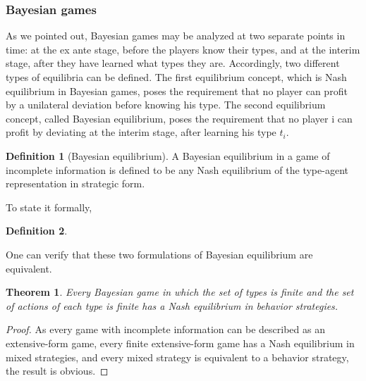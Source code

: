 \documentclass{article}
\newtheorem{Thm}{Theorem}[section]
\theoremstyle{definition}
\newtheorem{Def}{Definition}[section]
\begin{document}
\subsubsection{Bayesian games}
As we pointed out, Bayesian games may be analyzed at two separate points in time:
at the ex ante stage, before the players know their types, and at the interim stage, after they have learned what types they are.
Accordingly, two different types of equilibria can be defined. The first equilibrium concept, which is Nash equilibrium in Bayesian games, poses the requirement that no player can profit by a unilateral deviation before knowing his type.
The second equilibrium concept, called Bayesian equilibrium, poses the requirement that no player i can profit by deviating at the interim stage, after learning his type $t_i$.
\begin{Def}[Bayesian equilibrium]
    A Bayesian equilibrium in a game of incomplete information is defined to be any Nash equilibrium of the type-agent representation
    in strategic form.
\end{Def}
To state it formally,
\begin{Def}
    
\end{Def} 
One can verify that these two formulations of Bayesian equilibrium are equivalent.

\begin{Thm}
    Every Bayesian game in which the set of types is finite and the set of actions of each type is finite
    has a Nash equilibrium in behavior strategies.
\end{Thm}
\begin{proof}
    As every game with incomplete information can be described as an extensive-form game,
    every finite extensive-form game has a Nash equilibrium in mixed strategies,
    and every mixed strategy is equivalent to a behavior strategy,
    the result is obvious.
\end{proof}
\end{document}
